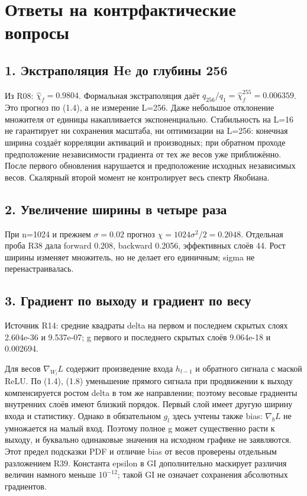 \section{Ответы на контрфактические вопросы}

\subsection*{1. Экстраполяция He до глубины 256}

Из R08: $\hat\chi_f=0.9804$. Формальная экстраполяция даёт $q_{256}/q_1=\hat\chi_f^{255}=0.006359$. Это прогноз по (1.4), а не измерение L=256. Даже небольшое отклонение множителя от единицы накапливается экспоненциально. Стабильность на L=16 не гарантирует ни сохранения масштаба, ни оптимизации на L=256: конечная ширина создаёт корреляции активаций и производных; при обратном проходе предположение независимости градиента от тех же весов уже приближённо. После первого обновления нарушается и предположение исходных независимых весов. Скалярный второй момент не контролирует весь спектр Якобиана.

\subsection*{2. Увеличение ширины в четыре раза}

При n=1024 и прежнем $\sigma=0.02$ прогноз $\chi=1024\sigma^2/2=0.2048$. Отдельная проба R38 дала forward 0.208, backward 0.2056, эффективных слоёв 44. Рост ширины изменяет множитель, но не делает его единичным; sigma не перенастраивалась.

\subsection*{3. Градиент по выходу и градиент по весу}

Источник R14: средние квадраты delta на первом и последнем скрытых слоях 2.604e-36 и 9.537e-07; g первого и последнего скрытых слоёв 9.064e-18 и 0.002694.

Для весов $\nabla_{W_l}L$ содержит произведение входа $h_{l-1}$ и обратного сигнала с маской ReLU. По (1.4), (1.8) уменьшение прямого сигнала при продвижении к выходу компенсируется ростом delta в том же направлении; поэтому весовые градиенты внутренних слоёв имеют близкий порядок. Первый слой имеет другую ширину входа и статистику. Однако в обязательном $g_l$ здесь учтены также bias: $\nabla_bL$ не умножается на малый вход. Поэтому полное g может существенно расти к выходу, и буквально одинаковые значения на исходном графике не заявляются. Этот предел подсказки PDF и отличие bias от весов проверены отдельным разложением R39. Константа epsilon в GI дополнительно маскирует различия величин намного меньше $10^{-12}$; такой GI не означает сохранения абсолютных градиентов.

